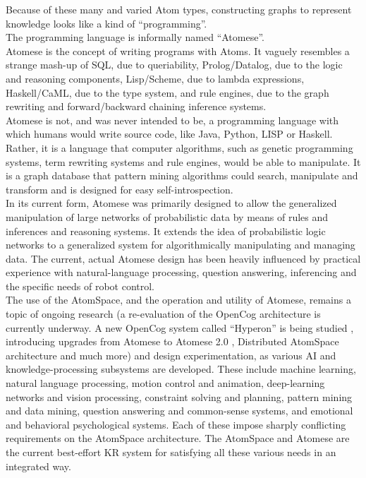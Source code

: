 Because of these many and varied Atom types, constructing graphs to represent knowledge looks like a kind of \enquote{programming}. \\
The programming language is informally named \enquote{Atomese}. \\ 
Atomese is the concept of writing programs with Atoms. 
It vaguely resembles a strange mash-up of SQL, due to queriability, Prolog/Datalog, due to the logic and reasoning components, Lisp/Scheme, due to lambda expressions, Haskell/CaML, due to the type system, and rule engines, due to the graph rewriting and forward/backward chaining inference systems. \\

Atomese is not, and was never intended to be, a programming language with which humans would write source code, like Java, Python, LISP or Haskell. 
Rather, it is a language that computer algorithms, such as genetic programming systems, term rewriting systems and rule engines, would be able to manipulate. 
It is a graph database that pattern mining algorithms could search, manipulate and transform and is designed for easy self-introspection. \\

In its current form, Atomese was primarily designed to allow the generalized manipulation of large networks of probabilistic data by means of rules and inferences and reasoning systems. It extends the idea of probabilistic logic networks to a generalized system for algorithmically manipulating and managing data. The current, actual Atomese design has been heavily influenced by practical experience with natural-language processing, question answering, inferencing and the specific needs of robot control. \\

The use of the AtomSpace, and the operation and utility of Atomese, remains a topic of ongoing research (a re-evaluation of the OpenCog architecture is currently underway. A new OpenCog system called \enquote{Hyperon} is being studied \cite{goertzel_potapov_senna_singularitynet-opencog_team_2020}, introducing upgrades from Atomese to Atomese 2.0 \cite{DBLP:journals/corr/abs-2004-05267}, Distributed AtomSpace architecture \cite{distributed_2017, senna_2018, potapov_2020_1, potapov_2020_2} and much more) and design experimentation, as various AI and knowledge-processing subsystems are developed. These include machine learning, natural language processing, motion control and animation, deep-learning networks and vision processing, constraint solving and planning, pattern mining and data mining, question answering and common-sense systems, and emotional and behavioral psychological systems. Each of these impose sharply conflicting requirements on the AtomSpace architecture. The AtomSpace and Atomese are the current best-effort KR system for satisfying all these various needs in an integrated way.

